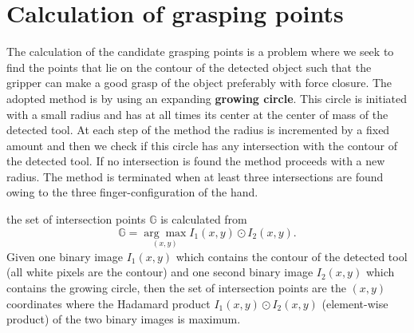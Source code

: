 \section{Calculation of grasping points}
%
The calculation of the candidate grasping points is a problem where we seek to find the points that lie on the contour of the detected object such that the gripper can make a good grasp of the object preferably with force closure. The adopted method is by using an expanding \textbf{growing circle}. This circle is initiated with a small radius and has at all times its center at the center of mass of the detected tool. At each step of the method the radius is incremented by a fixed amount and then we check if this circle has any intersection with the contour of the detected tool. If no intersection is found the method proceeds with a new radius. The method is terminated when at least three  intersections are found owing to the three finger-configuration of the hand.

the set of intersection points $\mathbb{G}$ is calculated from
\begin{equation}
\label{grasping-intersections}
\mathbb{G} = \underset{(x,y)}{\arg\max} I_1(x,y) \odot I_2(x,y).
\end{equation}
Given one binary image $I_1(x,y)$ which contains the contour of the detected tool (all white pixels are the contour) and one second binary image $I_2(x,y)$ which contains the growing circle, then the set of intersection points are the $(x, y)$ coordinates where the Hadamard product $I_1(x,y) \odot I_2(x,y)$ (element-wise product) of the two binary images is maximum.\\ 


